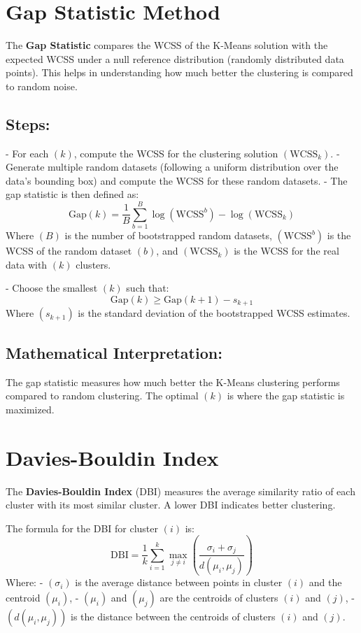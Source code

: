 \documentclass{article}
\begin{document}
\section*{Gap Statistic Method}

The \textbf{Gap Statistic} compares the WCSS of the K-Means solution with the expected WCSS under a null reference distribution (randomly distributed data points). This helps in understanding how much better the clustering is compared to random noise.

\subsection*{ Steps:}
- For each $( k )$, compute the WCSS for the clustering solution $( \text{WCSS}_k )$.
- Generate multiple random datasets (following a uniform distribution over the data’s bounding box) and compute the WCSS for these random datasets.
- The gap statistic is then defined as:
  $$
  \text{Gap}(k) = \frac{1}{B} \sum_{b=1}^{B} \log(\text{WCSS}^b) - \log(\text{WCSS}_k)
  $$
  Where $( B )$ is the number of bootstrapped random datasets, $( \text{WCSS}^b )$ is the WCSS of the random dataset $( b )$, and $( \text{WCSS}_k )$ is the WCSS for the real data with $( k )$ clusters.

- Choose the smallest $( k )$ such that:
  $$
  \text{Gap}(k) \geq \text{Gap}(k+1) - s_{k+1}
  $$
  Where $( s_{k+1} )$ is the standard deviation of the bootstrapped WCSS estimates.

\subsection*{ Mathematical Interpretation:}
The gap statistic measures how much better the K-Means clustering performs compared to random clustering. The optimal $( k )$ is where the gap statistic is maximized.

\section*{Davies-Bouldin Index}

The \textbf{Davies-Bouldin Index} (DBI) measures the average similarity ratio of each cluster with its most similar cluster. A lower DBI indicates better clustering.

The formula for the DBI for cluster $( i )$ is:
$$
\text{DBI} = \frac{1}{k} \sum_{i=1}^{k} \max_{j \neq i} \left( \frac{\sigma_i + \sigma_j}{d(\mu_i, \mu_j)} \right)
$$
Where:
- $( \sigma_i )$ is the average distance between points in cluster $( i )$ and the centroid $( \mu_i )$,
- $( \mu_i )$ and $( \mu_j )$ are the centroids of clusters $( i )$ and $( j )$,
- $( d(\mu_i, \mu_j) )$ is the distance between the centroids of clusters $( i )$ and $( j )$.
\end{document}
